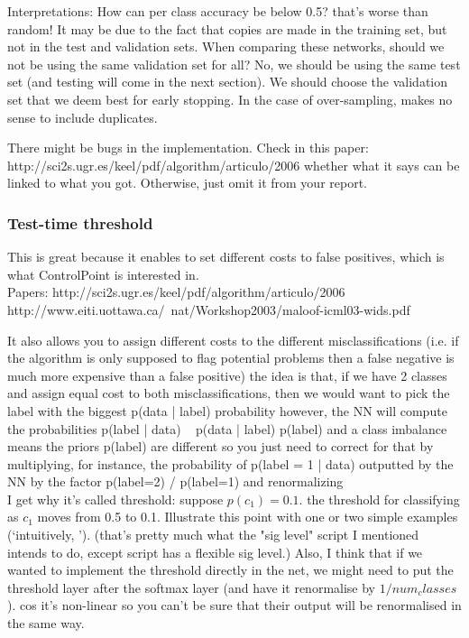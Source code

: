 \documentclass[a4paper,11pt]{article}
\begin{document}
Interpretations:
How can per class accuracy be below 0.5? that's worse than random! It may be due to the fact that copies are made in the training set, but not in the test and validation sets. 
When comparing these networks, should we not be using the same validation set for all? No, we should be using the same test set (and testing will come in the next section). We should choose the validation set that we deem best for early stopping. In the case of over-sampling, makes no sense to include duplicates. 

There might be bugs in the implementation. Check in this paper: http://sci2s.ugr.es/keel/pdf/algorithm/articulo/2006%
whether what it says can be linked to what you got. Otherwise, just omit it from your report. \\


\subsubsection{Test-time threshold}

This is great because it enables to set different costs to false positives, which is what ControlPoint is interested in. \\

Papers: 
http://sci2s.ugr.es/keel/pdf/algorithm/articulo/2006%
http://www.eiti.uottawa.ca/~nat/Workshop2003/maloof-icml03-wids.pdf

It also allows you to assign different costs to the different misclassifications (i.e. if the algorithm is only supposed to flag potential problems then a false negative is much more expensive than a false positive)
the idea is that, if we have 2 classes and assign equal cost to both misclassifications, then we would want to pick the label with the biggest p(data | label) probability
however, the NN will compute the probabilities p(label | data) ~ p(data | label) p(label)
and a class imbalance means the priors p(label) are different
so you just need to correct for that by multiplying, for instance, the probability of p(label = 1 | data) outputted by the NN by the factor p(label=2) / p(label=1) and renormalizing \\

I get why it's called threshold: suppose $p(c_1)=0.1$. the threshold for classifying as $c_1$ moves from 0.5 to 0.1. Illustrate this point with one or two simple examples (`intuitively, ').  (that's pretty much what the "sig level" script I mentioned intends to do, except script has a flexible sig level.)
Also, I think that if we wanted to implement the threshold directly in the net, we might need to put the threshold layer after the softmax layer (and have it renormalise by $1/num_classes$). cos it's non-linear so you can't be sure that their output will be renormalised in the same way. \\
\end{document}
